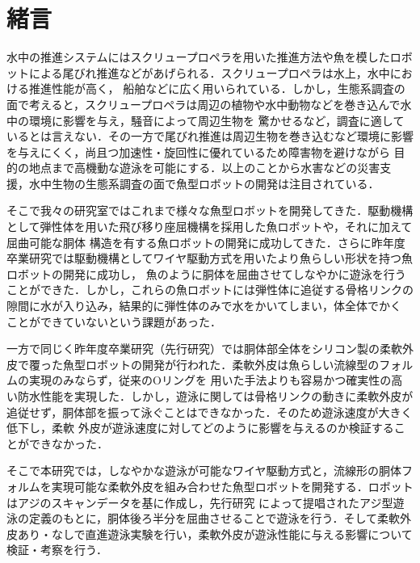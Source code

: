 \newpage
\setcounter{page}{1}
\section{緒言}
水中の推進システムにはスクリュープロペラを用いた推進方法や魚を模したロボットによる尾びれ推進などがあげられる\cite{ichi}．スクリュープロペラは水上，水中における推進性能が高く，
船舶などに広く用いられている．しかし，生態系調査の面で考えると，スクリュープロペラは周辺の植物や水中動物などを巻き込んで水中の環境に影響を与え，騒音によって周辺生物を
驚かせるなど，調査に適しているとは言えない．その一方で尾びれ推進は周辺生物を巻き込むなど環境に影響を与えにくく，尚且つ加速性・旋回性に優れているため障害物を避けながら
目的の地点まで高機動な遊泳を可能にする．以上のことから水害などの災害支援，水中生物の生態系調査の面で魚型ロボットの開発は注目されている\cite{ni}\cite{san}．

そこで我々の研究室ではこれまで様々な魚型ロボットを開発してきた．駆動機構として弾性体を用いた飛び移り座屈機構を採用した魚ロボット\cite{yon}\cite{go}や，それに加えて屈曲可能な胴体
構造を有する魚ロボット\cite{roku,nana,hachi}の開発に成功してきた．さらに昨年度卒業研究では駆動機構としてワイヤ駆動方式を用いたより魚らしい形状を持つ魚ロボットの開発に成功し，
魚のように胴体を屈曲させてしなやかに遊泳を行うことができた．しかし，これらの魚ロボットには弾性体に追従する骨格リンクの隙間に水が入り込み，結果的に弾性体のみで水をかいてしまい，体全体でかく
ことができていないという課題があった．

一方で同じく昨年度卒業研究（先行研究\cite{kyu}）では胴体部全体をシリコン製の柔軟外皮で覆った魚型ロボットの開発が行われた．柔軟外皮は魚らしい流線型のフォルムの実現のみならず，従来のOリングを
用いた手法よりも容易かつ確実性の高い防水性能を実現した．しかし，遊泳に関しては骨格リンクの動きに柔軟外皮が追従せず，胴体部を振って泳ぐことはできなかった．そのため遊泳速度が大きく低下し，柔軟
外皮が遊泳速度に対してどのように影響を与えるのか検証することができなかった．

そこで本研究では，しなやかな遊泳が可能なワイヤ駆動方式と，流線形の胴体フォルムを実現可能な柔軟外皮を組み合わせた魚型ロボットを開発する．ロボットはアジのスキャンデータを基に作成し，先行研究
\cite{juu}によって提唱されたアジ型遊泳の定義のもとに，胴体後ろ半分を屈曲させることで遊泳を行う．そして柔軟外皮あり・なしで直進遊泳実験を行い，柔軟外皮が遊泳性能に与える影響について検証・考察を行う．
